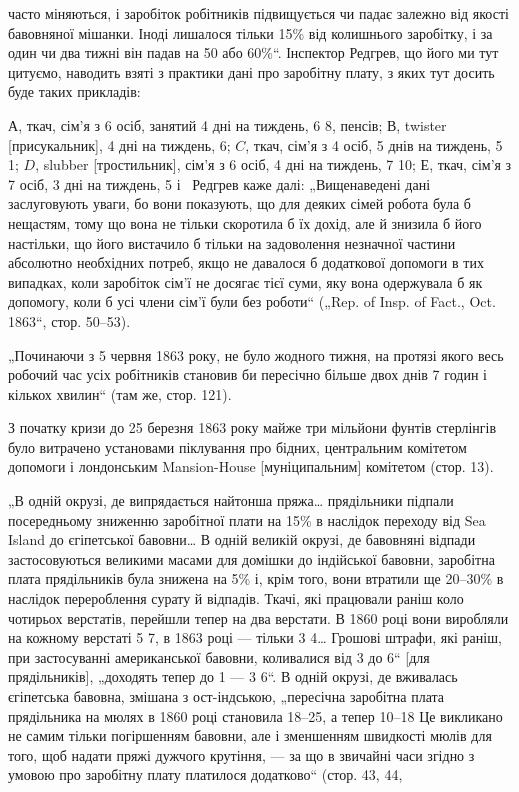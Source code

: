 \parcont{}  %
часто міняються, і заробіток робітників підвищується чи падає
залежно від якості бавовняної мішанки. Іноді лишалося тільки
15\% від колишнього заробітку, і за один чи два тижні він
падав на 50 або 60\%“. Інспектор Редгрев, що його ми тут
цитуємо, наводить взяті з практики дані про заробітну плату,
з яких тут досить буде таких прикладів:

$А$, ткач, сім’я з 6 осіб, занятий 4 дні на тиждень, 6
8, пенсів; $В$, twister [присукальник], 4 дні на тиждень, 6;
$C$, ткач, сім’я з 4 осіб, 5 днів на тиждень, 5
1; $D$, slubber [тростильник], сім’я з 6 осіб, 4 дні на тиждень,
7 10; $Е$, ткач, сім’я з 7 осіб, 3 дні на
тиждень, 5 і~ Редгрев каже далі: „Вищенаведені
дані заслуговують уваги, бо вони показують, що для деяких
сімей робота була б нещастям, тому що вона не тільки скоротила
б їх дохід, але й знизила б його настільки, що його вистачило
б тільки на задоволення незначної частини абсолютно
необхідних потреб, якщо не давалося б додаткової допомоги
в тих випадках, коли заробіток сім’ї не досягає тієї суми, яку
вона одержувала б як допомогу, коли б усі члени сім’ї були
без роботи“ („Rep. of Insp. of Fact., Oct. 1863“, стор. 50--53).

„Починаючи з 5 червня 1863 року, не було жодного тижня,
на протязі якого весь робочий час усіх робітників становив би
пересічно більше двох днів 7 годин і кількох хвилин“ (там же,
стор. 121).

З початку кризи до 25 березня 1863 року майже три мільйони
фунтів стерлінгів було витрачено установами піклування
про бідних, центральним комітетом допомоги і лондонським
Mansion-House [муніципальним] комітетом (стор. 13).

„В одній окрузі, де випрядається найтонша пряжа\dots{} прядільники
підпали посередньому зниженню заробітної плати на 15\%
в наслідок переходу від Sea Island до єгіпетської бавовни\dots{}
В одній великій окрузі, де бавовняні відпади застосовуються
великими масами для домішки до індійської бавовни, заробітна
плата прядільників була знижена на 5\% і, крім того, вони
втратили ще 20--30\% в наслідок перероблення сурату й відпадів.
Ткачі, які працювали раніш коло чотирьох верстатів, перейшли
тепер на два верстати. В 1860 році вони виробляли на кожному
верстаті 5 7, в 1863 році — тільки 3
4\dots{} Грошові штрафи, які раніш, при застосуванні американської
бавовни, коливалися від 3 до 6“ [для прядільників],
„доходять тепер до 1 — 3 6“.
В одній окрузі, де вживалась єгіпетська бавовна, змішана
з ост-індською, „пересічна заробітна плата прядільника на мюлях
в 1860 році становила 18--25, а тепер 10--18
Це викликано не самим тільки погіршенням бавовни,
але і зменшенням швидкості мюлів для того, щоб надати
пряжі дужчого крутіння, — за що в звичайні часи згідно з умовою
про заробітну плату платилося додатково“ (стор. 43, 44,
\parbreak{}  %
